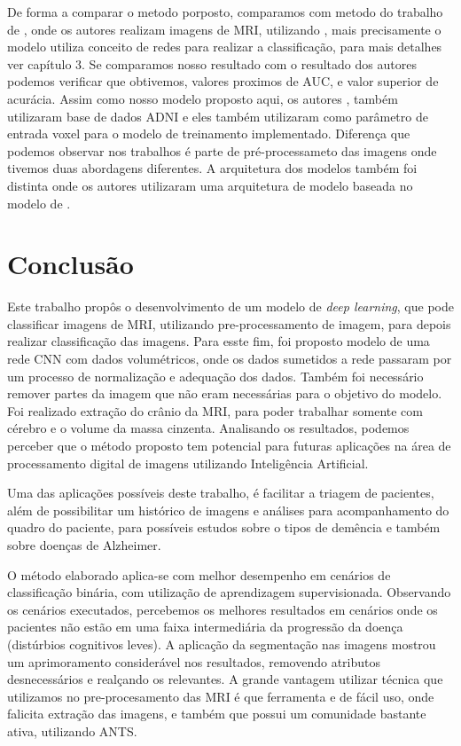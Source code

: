\documentclass[openright]{UFRGS} %
\begin{document}
De forma a comparar o metodo porposto, comparamos com metodo do trabalho de \cite{rieke2018visualizing}, onde os autores realizam  imagens de MRI, utilizando  , mais precisamente o modelo  utiliza conceito de redes  para realizar a classificação, para mais detalhes ver capítulo 3. Se comparamos nosso resultado com o resultado dos autores podemos verificar que obtivemos, valores proximos de AUC, e valor superior de acurácia. Assim como nosso modelo proposto aqui, os autores \cite{rieke2018visualizing}, também utilizaram base de dados ADNI e eles também utilizaram como parâmetro de entrada voxel para o modelo de treinamento implementado. Diferença que podemos observar nos trabalhos é parte de pré-processameto das imagens onde tivemos duas abordagens diferentes. A arquitetura dos modelos também foi distinta onde \cite{rieke2018visualizing}  os autores utilizaram uma arquitetura de modelo baseada no modelo de \cite{khvostikov20183d}.

\chapter{Conclusão}

Este trabalho propôs o desenvolvimento de um modelo de \textit{deep learning}, que pode classificar imagens de MRI,
utilizando pre-processamento de imagem, para depois realizar classificação das imagens. Para esste fim, foi proposto modelo de uma rede CNN com dados
volumétricos, onde os dados sumetidos a rede passaram por um processo de
normalização e adequação dos dados. Também foi necessário  remover partes da imagem que não eram  necessárias para o objetivo do modelo. Foi realizado  extração do crânio da MRI, para poder trabalhar somente com cérebro e o volume da massa cinzenta. Analisando os resultados, podemos perceber que o método proposto tem potencial para futuras aplicações na área de processamento digital de imagens utilizando Inteligência Artificial.

Uma das aplicações possíveis deste trabalho, é facilitar a triagem de pacientes, além de possibilitar um histórico de imagens e análises para acompanhamento  do quadro do paciente, para possíveis estudos sobre o tipos de demência  e também sobre doenças de Alzheimer.


O método elaborado aplica-se com melhor desempenho em cenários de classificação
binária, com utilização de aprendizagem supervisionada. Observando os cenários executados, percebemos os melhores resultados em cenários onde os pacientes não estão em
uma faixa intermediária da progressão da doença (distúrbios cognitivos leves). A aplicação da segmentação nas imagens mostrou um aprimoramento considerável nos resultados, removendo atributos desnecessários e realçando os relevantes. A grande vantagem utilizar técnica que utilizamos no pre-procesamento das MRI é que ferramenta e de fácil uso, onde falicita extração  das imagens, e também que possui um comunidade bastante ativa, utilizando ANTS.
\end{document}

